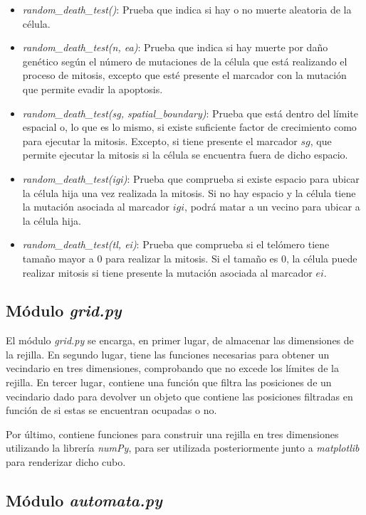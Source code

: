 \begin{itemize}
  \item \textit{random\_death\_test()}: Prueba que indica si hay o no muerte aleatoria de la célula.
  \item \textit{random\_death\_test(n, ea)}: Prueba que indica si hay muerte por daño genético según
  el número de mutaciones de la célula que está realizando el proceso de mitosis, excepto que esté
  presente el marcador con la mutación que permite evadir la apoptosis.
  \item \textit{random\_death\_test(sg, spatial\_boundary)}: Prueba que está dentro del
  límite espacial o, lo que es lo mismo, si existe suficiente factor de crecimiento como
  para ejecutar la mitosis. Excepto, si tiene presente el marcador $sg$, que permite
  ejecutar la mitosis si la célula se encuentra fuera de dicho espacio.
  \item \textit{random\_death\_test(igi)}: Prueba que comprueba si existe espacio para ubicar la célula
  hija una vez realizada la mitosis. Si no hay espacio y la célula tiene la mutación asociada al
  marcador $igi$, podrá matar a un vecino para ubicar a la célula hija.
  \item \textit{random\_death\_test(tl, ei)}: Prueba que comprueba si el telómero tiene tamaño
  mayor a $0$ para realizar la mitosis. Si el tamaño es $0$, la célula puede realizar mitosis
  si tiene presente la mutación asociada al marcador $ei$.
\end{itemize}

\subsection{Módulo \textit{grid.py}}

El módulo \textit{grid.py} se encarga, en primer lugar, de almacenar las dimensiones de la
rejilla. En segundo lugar, tiene las funciones necesarias para obtener un vecindario en
tres dimensiones, comprobando que no excede los límites de la rejilla. En tercer lugar, contiene
una función que filtra las posiciones de un vecindario dado para devolver un objeto que contiene
las posiciones filtradas en función de si estas se encuentran ocupadas o no.

Por último, contiene funciones para construir una rejilla en tres dimensiones utilizando
la librería \textit{numPy}, para ser utilizada posteriormente junto a \textit{matplotlib}
para renderizar dicho cubo.

\subsection{Módulo \textit{automata.py}}

